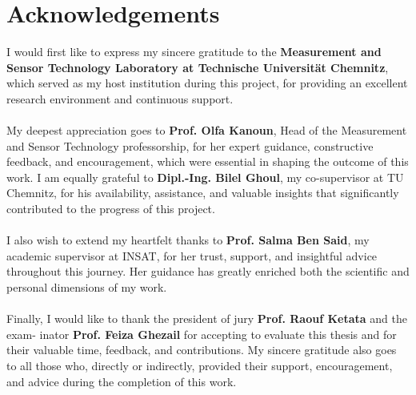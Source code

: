 \chapter*{Acknowledgements}
\normalsize{}
I would first like to express my sincere gratitude to the\textbf{ Measurement and Sensor Technology Laboratory at Technische Universität Chemnitz}, which served as my host institution during this project, for providing an excellent research environment and continuous support.
\\
\normalsize{}
\\
My deepest appreciation goes to \textbf{Prof. Olfa Kanoun}, Head of the Measurement and Sensor Technology professorship, for her expert guidance, constructive feedback, and encouragement, which were essential in shaping the outcome of this work. I am equally grateful to \textbf{Dipl.-Ing. Bilel Ghoul}, my co-supervisor at TU Chemnitz, for his availability, assistance, and valuable insights that significantly contributed to the progress of this project.
\\
\normalsize{}
\\
I also wish to extend my heartfelt thanks to \textbf{Prof. Salma Ben Said}, my academic supervisor at INSAT, for her trust, support, and insightful advice throughout this journey. Her guidance has greatly enriched both the scientific and personal dimensions of my work.
\\
\normalsize{}
\\
Finally, I would like to thank the president of jury \textbf{Prof. Raouf Ketata} and the exam-
inator \textbf{Prof. Feiza Ghezail} for accepting to evaluate this thesis and for their valuable time, feedback, and contributions. My sincere gratitude also goes to all those who, directly or indirectly, provided their support, encouragement, and advice during the completion of this work.

